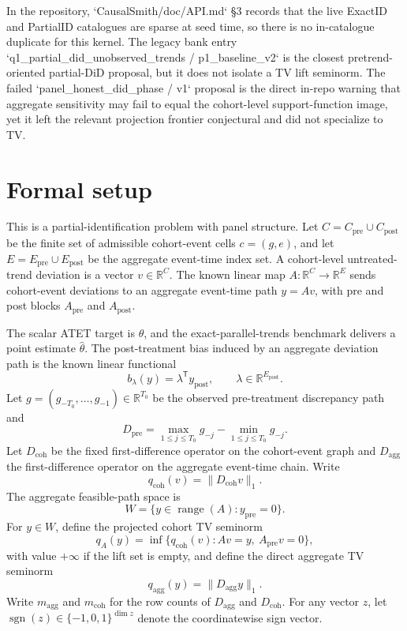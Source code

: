 \documentclass[11pt]{article}
\newcommand{\transpose}{\mathsf{T}}
\newcommand{\R}{\mathbb{R}}
\theoremstyle{definition}
\theoremstyle{plain}
\theoremstyle{remark}
\begin{document}
In the repository, `CausalSmith/doc/API.md` \S3 records that the live ExactID and PartialID catalogues are sparse at seed time, so there is no in-catalogue duplicate for this kernel. The legacy bank entry `q1_partial_did_unobserved_trends / p1_baseline_v2` is the closest pretrend-oriented partial-DiD proposal, but it does not isolate a TV lift seminorm. The failed `panel_honest_did_phase / v1` proposal is the direct in-repo warning that aggregate sensitivity may fail to equal the cohort-level support-function image, yet it left the relevant projection frontier conjectural and did not specialize to TV.

\section{Formal setup}
This is a partial-identification problem with panel structure. Let \(C=C_{\mathrm{pre}}\cup C_{\mathrm{post}}\) be the finite set of admissible cohort-event cells \(c=(g,e)\), and let \(E=E_{\mathrm{pre}}\cup E_{\mathrm{post}}\) be the aggregate event-time index set. A cohort-level untreated-trend deviation is a vector \(v\in\R^C\). The known linear map \(A:\R^C\to\R^E\) sends cohort-event deviations to an aggregate event-time path \(y=Av\), with pre and post blocks \(A_{\mathrm{pre}}\) and \(A_{\mathrm{post}}\).

The scalar ATET target is \(\theta\), and the exact-parallel-trends benchmark delivers a point estimate \(\hat\theta\). The post-treatment bias induced by an aggregate deviation path is the known linear functional
\[
b_\lambda(y)=\lambda^\transpose y_{\mathrm{post}},
\qquad
\lambda\in\R^{E_{\mathrm{post}}}.
\]
Let \(g=(g_{-T_0},\ldots,g_{-1})\in\R^{T_0}\) be the observed pre-treatment discrepancy path and
\[
D_{\mathrm{pre}}=\max_{1\le j\le T_0} g_{-j}-\min_{1\le j\le T_0} g_{-j}.
\]
Let \(D_{\mathrm{coh}}\) be the fixed first-difference operator on the cohort-event graph and \(D_{\mathrm{agg}}\) the first-difference operator on the aggregate event-time chain. Write
\[
q_{\mathrm{coh}}(v)=\|D_{\mathrm{coh}}v\|_1.
\]
The aggregate feasible-path space is
\[
W=\{y\in\operatorname{range}(A): y_{\mathrm{pre}}=0\}.
\]
For \(y\in W\), define the projected cohort TV seminorm
\[
q_A(y)
=
\inf\{q_{\mathrm{coh}}(v): Av=y,\ A_{\mathrm{pre}}v=0\},
\]
with value \(+\infty\) if the lift set is empty, and define the direct aggregate TV seminorm
\[
q_{\mathrm{agg}}(y)=\|D_{\mathrm{agg}}y\|_1.
\]
Write \(m_{\mathrm{agg}}\) and \(m_{\mathrm{coh}}\) for the row counts of \(D_{\mathrm{agg}}\) and \(D_{\mathrm{coh}}\). For any vector \(z\), let \(\operatorname{sgn}(z)\in\{-1,0,1\}^{\dim z}\) denote the coordinatewise sign vector.
\end{document}
